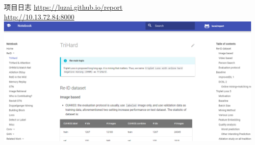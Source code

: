 \documentclass[usenames,dvipsnames,notes]{beamer}
\begin{document}
\begin{frame}{项目日志}
\url{https://luzai.github.io/report}  \\
\url{http://10.13.72.84:8000} \\ 
\includegraphics[width=\textwidth]{fig/ref.png}
\end{frame}
\end{document}
